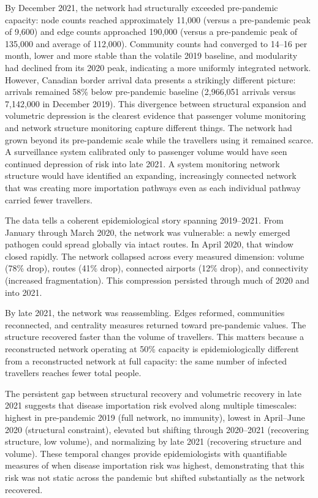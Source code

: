 \documentclass{elsarticle}
\begin{document}
By December 2021, the network had structurally exceeded pre-pandemic capacity: node counts reached approximately 11,000 (versus a pre-pandemic peak of 9,600) and edge counts approached 190,000 (versus a pre-pandemic peak of 135,000 and average of 112,000). Community counts had converged to 14--16 per month, lower and more stable than the volatile 2019 baseline, and modularity had declined from its 2020 peak, indicating a more uniformly integrated network. However, Canadian border arrival data presents a strikingly different picture: arrivals remained 58\% below pre-pandemic baseline (2,966,051 arrivals versus 7,142,000 in December 2019). This divergence between structural expansion and volumetric depression is the clearest evidence that passenger volume monitoring and network structure monitoring capture different things. The network had grown beyond its pre-pandemic scale while the travellers using it remained scarce. A surveillance system calibrated only to passenger volume would have seen continued depression of risk into late 2021. A system monitoring network structure would have identified an expanding, increasingly connected network that was creating more importation pathways even as each individual pathway carried fewer travellers.

The data tells a coherent epidemiological story spanning 2019--2021. From January through March 2020, the network was vulnerable: a newly emerged pathogen could spread globally via intact routes. In April 2020, that window closed rapidly. The network collapsed across every measured dimension: volume (78\% drop), routes (41\% drop), connected airports (12\% drop), and connectivity (increased fragmentation). This compression persisted through much of 2020 and into 2021.

By late 2021, the network was reassembling. Edges reformed, communities reconnected, and centrality measures returned toward pre-pandemic values. The structure recovered faster than the volume of travellers. This matters because a reconstructed network operating at 50\% capacity is epidemiologically different from a reconstructed network at full capacity: the same number of infected travellers reaches fewer total people.

The persistent gap between structural recovery and volumetric recovery in late 2021 suggests that disease importation risk evolved along multiple timescales: highest in pre-pandemic 2019 (full network, no immunity), lowest in April--June 2020 (structural constraint), elevated but shifting through 2020--2021 (recovering structure, low volume), and normalizing by late 2021 (recovering structure and volume). These temporal changes provide epidemiologists with quantifiable measures of when disease importation risk was highest, demonstrating that this risk was not static across the pandemic but shifted substantially as the network recovered.
\end{document}

